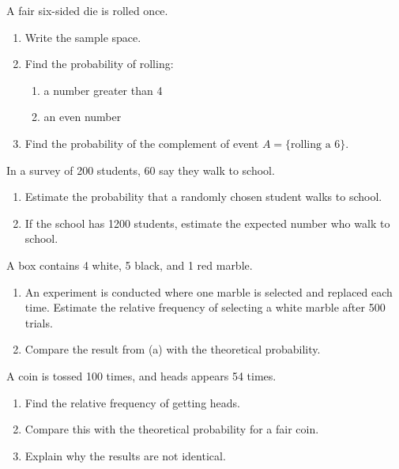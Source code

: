 \documentclass[11pt]{article}
\newcounter{question}
\begin{document}
\begin{question}
A fair six-sided die is rolled once.
\begin{enumerate}
    \item Write the sample space.
    \item Find the probability of rolling:
    \begin{enumerate}
        \item a number greater than 4
        \item an even number
    \end{enumerate}
    \item Find the probability of the complement of event $A = \{\text{rolling a 6}\}$.
\end{enumerate}
\end{question}

\begin{question}
In a survey of 200 students, 60 say they walk to school.
\begin{enumerate}
    \item Estimate the probability that a randomly chosen student walks to school.
    \item If the school has 1200 students, estimate the expected number who walk to school.
\end{enumerate}
\end{question}

\begin{question}
A box contains 4 white, 5 black, and 1 red marble.
\begin{enumerate}
    \item An experiment is conducted where one marble is selected and replaced each time.  
    Estimate the relative frequency of selecting a white marble after 500 trials.
    \item Compare the result from (a) with the theoretical probability.
\end{enumerate}
\end{question}

\begin{question}
A coin is tossed 100 times, and heads appears 54 times.
\begin{enumerate}
    \item Find the relative frequency of getting heads.
    \item Compare this with the theoretical probability for a fair coin.
    \item Explain why the results are not identical.
\end{enumerate}
\end{question}
\end{document}
